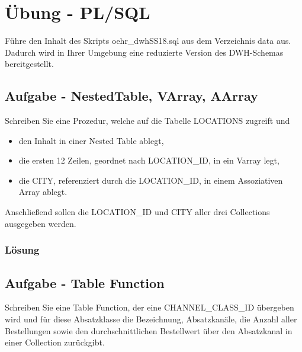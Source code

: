 \section{Übung - PL/SQL}
\label{sec:uebung_02}
Führe den Inhalt des Skripts oehr\_dwhSS18.sql aus dem Verzeichnis data aus. Dadurch wird in Ihrer Umgebung eine reduzierte Version des DWH-Schemas bereitgestellt.

\subsection{Aufgabe - NestedTable, VArray, AArray}
\label{sec:uebung_02.aufgabe_01}
Schreiben Sie eine Prozedur, welche auf die Tabelle LOCATIONS zugreift und
\begin{itemize}
  \item den Inhalt in einer Nested Table ablegt,
  \item die ersten 12 Zeilen, geordnet nach LOCATION\_ID, in ein Varray legt,
  \item die CITY, referenziert durch die LOCATION\_ID, in einem Assoziativen Array ablegt.
\end{itemize}
Anschließend sollen die LOCATION\_ID und CITY aller drei Collections ausgegeben werden.

\subsubsection*{Lösung}
\label{sec:uebung_02.aufgabe_01.loesung}


\subsection{Aufgabe - Table Function}
\label{sec:uebung_02.aufgabe_02}
Schreiben Sie eine Table Function, der eine CHANNEL\_CLASS\_ID übergeben wird und für diese Absatzklasse die Bezeichnung, Absatzkanäle, die Anzahl aller Bestellungen sowie den durchschnittlichen Bestellwert über den Absatzkanal in einer Collection zurückgibt.

